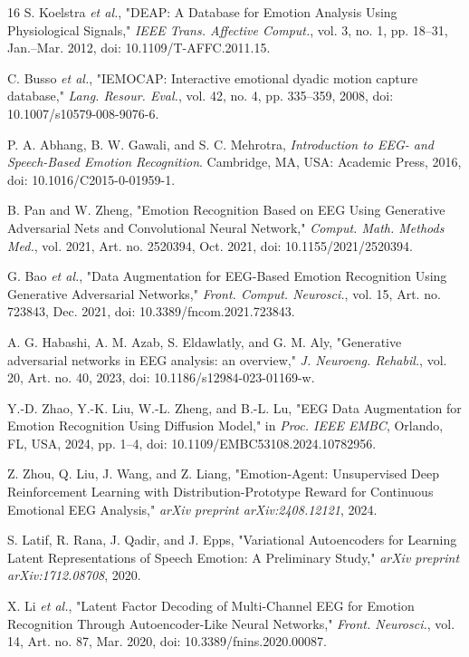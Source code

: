 \documentclass[conference]{IEEEtran}
\begin{document}
\begin{thebibliography}{16}
S. Koelstra \textit{et al.}, "DEAP: A Database for Emotion Analysis Using Physiological Signals," \textit{IEEE Trans. Affective Comput.}, vol. 3, no. 1, pp. 18--31, Jan.--Mar. 2012, doi: 10.1109/T-AFFC.2011.15.

C. Busso \textit{et al.}, "IEMOCAP: Interactive emotional dyadic motion capture database," \textit{Lang. Resour. Eval.}, vol. 42, no. 4, pp. 335--359, 2008, doi: 10.1007/s10579-008-9076-6.

P. A. Abhang, B. W. Gawali, and S. C. Mehrotra, \textit{Introduction to EEG- and Speech-Based Emotion Recognition}. Cambridge, MA, USA: Academic Press, 2016, doi: 10.1016/C2015-0-01959-1.

B. Pan and W. Zheng, "Emotion Recognition Based on EEG Using Generative Adversarial Nets and Convolutional Neural Network," \textit{Comput. Math. Methods Med.}, vol. 2021, Art. no. 2520394, Oct. 2021, doi: 10.1155/2021/2520394.

G. Bao \textit{et al.}, "Data Augmentation for EEG-Based Emotion Recognition Using Generative Adversarial Networks," \textit{Front. Comput. Neurosci.}, vol. 15, Art. no. 723843, Dec. 2021, doi: 10.3389/fncom.2021.723843.

A. G. Habashi, A. M. Azab, S. Eldawlatly, and G. M. Aly, "Generative adversarial networks in EEG analysis: an overview," \textit{J. Neuroeng. Rehabil.}, vol. 20, Art. no. 40, 2023, doi: 10.1186/s12984-023-01169-w.

Y.-D. Zhao, Y.-K. Liu, W.-L. Zheng, and B.-L. Lu, "EEG Data Augmentation for Emotion Recognition Using Diffusion Model," in \textit{Proc. IEEE EMBC}, Orlando, FL, USA, 2024, pp. 1--4, doi: 10.1109/EMBC53108.2024.10782956.

Z. Zhou, Q. Liu, J. Wang, and Z. Liang, "Emotion-Agent: Unsupervised Deep Reinforcement Learning with Distribution-Prototype Reward for Continuous Emotional EEG Analysis," \textit{arXiv preprint arXiv:2408.12121}, 2024.

S. Latif, R. Rana, J. Qadir, and J. Epps, "Variational Autoencoders for Learning Latent Representations of Speech Emotion: A Preliminary Study," \textit{arXiv preprint arXiv:1712.08708}, 2020.

X. Li \textit{et al.}, "Latent Factor Decoding of Multi-Channel EEG for Emotion Recognition Through Autoencoder-Like Neural Networks," \textit{Front. Neurosci.}, vol. 14, Art. no. 87, Mar. 2020, doi: 10.3389/fnins.2020.00087.


\end{thebibliography}
\end{document}
